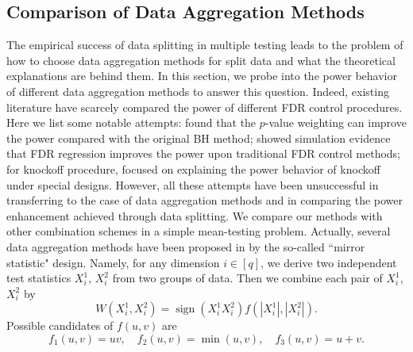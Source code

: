 \documentclass[12pt]{article}
\newcommand{\abs}[1]{\left\lvert#1\right\rvert}
\theoremstyle{plain}
\begin{document}
\subsection{Comparison of Data Aggregation Methods } \label{sec:compare}
The empirical success of data splitting in multiple testing leads to the problem of how to choose data aggregation methods for split data and what the theoretical explanations are behind them. In this section, we probe into the power behavior of different data aggregation methods to answer this question. Indeed, existing literature have scarcely compared the power of different FDR control procedures. Here we list some notable attempts: \cite{genovese2006false} found that the $p$-value weighting can improve the power compared with the original BH method; \cite{scott2015false} showed simulation evidence that FDR regression improves the power upon traditional FDR control methods; for knockoff procedure,  \cite{liu2019power,weinstein2020power} focused on explaining the power behavior of knockoff under special designs. 
However, all these attempts have been unsuccessful in transferring to the case of data aggregation methods and in comparing the power enhancement achieved through data splitting.
We compare our methods with other combination schemes in a simple mean-testing problem. Actually, several data aggregation methods have been proposed in \cite{dai2022false} by the so-called ``mirror statistic" design. Namely, for any dimension $i\in [q]$, we derive two independent test statistics $X^1_i$, $X^2_i$ from two groups of data. Then we combine each pair of $X^1_i$, $X^2_i$ by 
\begin{equation}\label{eq:mirror}
	W(X^1_i,X^2_i)=\operatorname{sign}(X^1_i X^2_i )f(\abs{X^1_i},\abs{X^2_i} ).
\end{equation}
Possible candidates of $f(u,v)$ are 
\begin{equation}\label{eq:mirror-choice}
	f_1(u, v)=u v, \quad f_2(u, v)= \min (u, v),\quad f_3(u, v)=u+v.
\end{equation}
\end{document}
